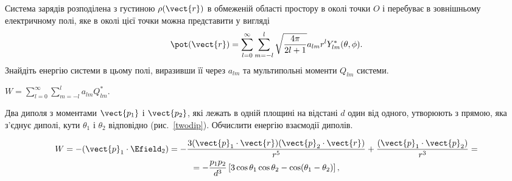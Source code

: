 \begin{problem}
    Система зарядів розподілена з густиною $\rho(\vect{r})$ в обмеженій області простору в околі точки $O$ і перебуває в зовнішньому електричному полі, яке в околі цієї точки можна представити у вигляді
    \[
        \pot(\vect{r}) = \sum\limits_{l=0}^{\infty}\sum\limits_{m=-l}^{l}\sqrt{\frac{4\pi}{2l + 1}}a_{lm}r^lY^*_{lm}(\theta, \phi).
    \]
    Знайдіть енергію системи в цьому полі,  виразивши її через $a_{lm}$ та мультипольні моменти $Q_{lm}$ системи.
\begin{solution}
    $W = \sum\limits_{l=0}^{\infty}\sum\limits_{m=-l}^{l}a_{lm}Q_{lm}^*$.
\end{solution}
\end{problem}



\begin{problem}\label{prb:twodip}
Два диполя з моментами $\vect{p_1}$ і $\vect{p_2}$, які лежать в одній площині на відстані $d$ один від одного, утворюють з прямою, яка з'єднує диполі, кути $\theta_1$ і $\theta_2$ відповідно (рис.~\ref{twodip}). Обчислити енергію взаємодії диполів.
\begin{solution}
    \begin{multline*}
    	W = -(\vect{p}_1\cdot \Efield_2) = -\frac{3(\vect{p}_1\cdot\vect{r})(\vect{p}_2\cdot\vect{r})}{r^5}  + \frac{(\vect{p}_1\cdot\vect{p}_2)}{r^3} =\\ = -\frac{p_1p_2}{d^3}\left[ 3\cos\theta_1\cos\theta_2 - \cos(\theta_1 - \theta_2)\right] ,
    \end{multline*}
\end{solution}
\end{problem}

